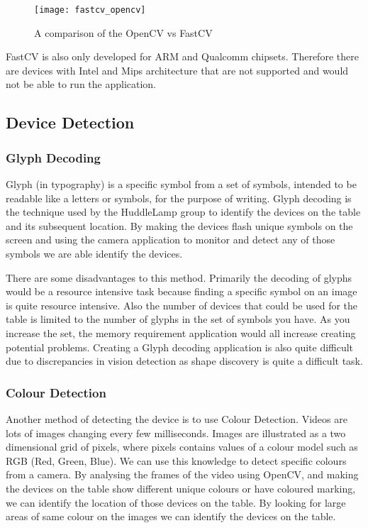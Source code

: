 \begin{figure}[H]
    \centering
    \texttt{[image: fastcv\_opencv]}
    \caption{A comparison of the OpenCV vs FastCV \cite{fastcv_opencv}}
    \label{opencv_fastcv}
\end{figure}

FastCV is also only developed for ARM and Qualcomm chipsets. Therefore there are devices with Intel and Mips architecture that are not supported and would not be able to run the application.

\subsection{Device Detection} \label{device_identification}

\subsubsection{Glyph Decoding}
Glyph (in typography) is a specific symbol from a set of symbols, intended to be readable like a letters or symbols, for the purpose of writing\cite{glyph-wiki}. Glyph decoding is the technique used by the HuddleLamp group to identify the devices on the table and its subsequent location\cite{huddlelamp-paper}. By making the devices flash unique symbols on the screen and using the camera application to monitor and detect any of those symbols we are able identify the devices. 

There are some disadvantages to this method. Primarily the decoding of glyphs would be a resource intensive task because finding a specific symbol on an image is quite resource intensive. Also the number of devices that could be used for the table is limited to the number of glyphs in the set of symbols you have. As you increase the set, the memory requirement application would all increase creating potential problems. Creating a Glyph decoding application is also quite difficult due to discrepancies in vision detection as shape discovery is quite a difficult task\cite{shape_recognition}.
\subsubsection{Colour Detection}
Another method of detecting the device is to use Colour Detection. Videos are lots of images changing every few milliseconds\cite{video-wiki}. Images are illustrated as a two dimensional grid of pixels, where pixels contains values of a colour model such as RGB (Red, Green, Blue). We can use this knowledge to detect specific colours from a camera.
By analysing the frames of the video using OpenCV, and making the devices on the table show different unique colours or have coloured marking, we can identify the location of those devices on the table. By looking for large areas of same colour on the images we can identify the devices on the table.


